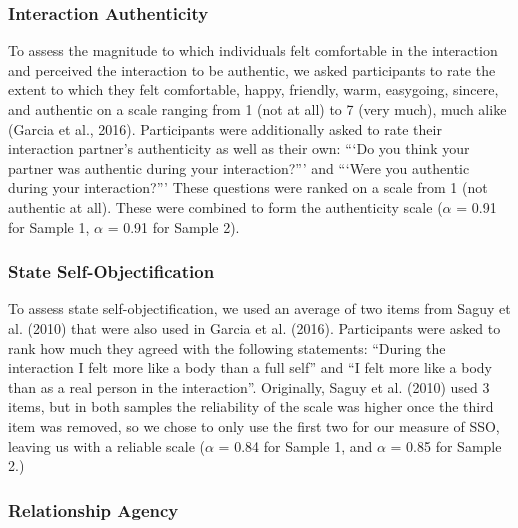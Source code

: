 \documentclass[man]{apa6}
\begin{document}
\subsubsection{Interaction Authenticity}\label{interaction-authenticity}

To assess the magnitude to which individuals felt comfortable in the
interaction and perceived the interaction to be authentic, we asked
participants to rate the extent to which they felt comfortable, happy,
friendly, warm, easygoing, sincere, and authentic on a scale ranging
from 1 (not at all) to 7 (very much), much alike (Garcia et al., 2016).
Participants were additionally asked to rate their interaction partner's
authenticity as well as their own: \enquote{`Do you think your partner
was authentic during your interaction?}' and \enquote{`Were you
authentic during your interaction?}' These questions were ranked on a
scale from 1 (not authentic at all). These were combined to form the
authenticity scale (\(\alpha\) = 0.91 for Sample 1, \(\alpha\) = 0.91
for Sample 2).

\subsubsection{State
Self-Objectification}\label{state-self-objectification}

To assess state self-objectification, we used an average of two items
from Saguy et al. (2010) that were also used in Garcia et al. (2016).
Participants were asked to rank how much they agreed with the following
statements: \enquote{During the interaction I felt more like a body than
a full self} and \enquote{I felt more like a body than as a real person
in the interaction}. Originally, Saguy et al. (2010) used 3 items, but
in both samples the reliability of the scale was higher once the third
item was removed, so we chose to only use the first two for our measure
of SSO, leaving us with a reliable scale (\(\alpha\) = 0.84 for Sample
1, and \(\alpha\) = 0.85 for Sample 2.)

\subsubsection{Relationship Agency}\label{relationship-agency}
\end{document}
